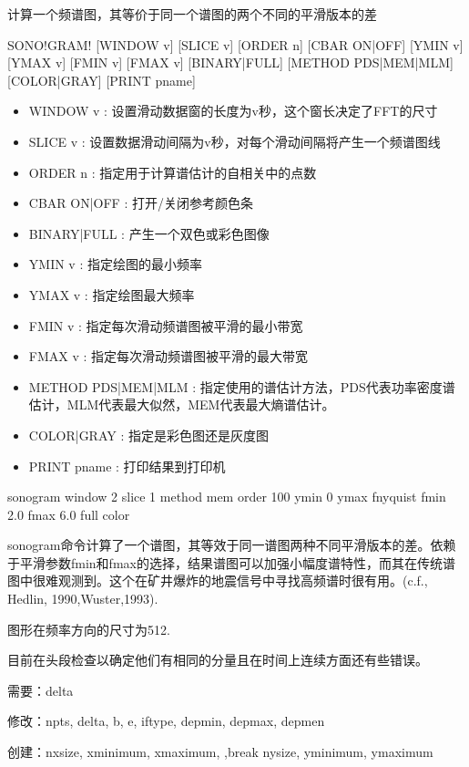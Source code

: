 \label{cmd:sonogram}

计算一个频谱图，其等价于同一个谱图的两个不同的平滑版本的差

\begin{SACSTX}
SONO!GRAM! [WINDOW v] [SLICE v] [ORDER n] [CBAR ON|OFF] 
    [YMIN v] [YMAX v] [FMIN v] [FMAX v] [BINARY|FULL] 
    [METHOD PDS|MEM|MLM] [COLOR|GRAY] [PRINT pname]
\end{SACSTX}

\begin{itemize}
\item WINDOW v : 设置滑动数据窗的长度为v秒，这个窗长决定了FFT的尺寸 
\item SLICE v : 设置数据滑动间隔为v秒，对每个滑动间隔将产生一个频谱图线 
\item ORDER n : 指定用于计算谱估计的自相关中的点数 
\item CBAR {ON|OFF} : 打开/关闭参考颜色条 
\item BINARY|FULL : 产生一个双色或彩色图像 
\item YMIN v : 指定绘图的最小频率  
\item YMAX v : 指定绘图最大频率 
\item FMIN v : 指定每次滑动频谱图被平滑的最小带宽 
\item FMAX v : 指定每次滑动频谱图被平滑的最大带宽  
\item METHOD {PDS|MEM|MLM} : 指定使用的谱估计方法，PDS代表功率密度谱估计，MLM代表最大似然，MEM代表最大熵谱估计。 
\item COLOR|GRAY : 指定是彩色图还是灰度图 
\item PRINT pname : 打印结果到打印机 
\end{itemize}
 
\begin{SACDFT}
sonogram window 2 slice 1 method mem order 100 ymin 0 ymax 	
    fnyquist fmin 2.0 fmax 6.0 full color
\end{SACDFT}

sonogram命令计算了一个谱图，其等效于同一谱图两种不同平滑版本的差。依赖于平滑参数fmin和fmax的选择，结果谱图可以加强小幅度谱特性，而其在传统谱图中很难观测到。这个在矿井爆炸的地震信号中寻找高频谱时很有用。(c.f., Hedlin, 1990,Wuster,1993).

图形在频率方向的尺寸为512.

目前在头段检查以确定他们有相同的分量且在时间上连续方面还有些错误。

需要：delta

修改：npts, delta, b, e, iftype, depmin, depmax, depmen

创建：nxsize, xminimum, xmaximum, ,break nysize, yminimum, ymaximum
